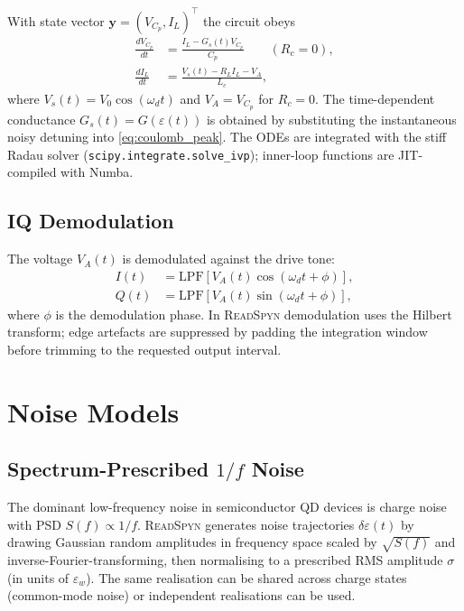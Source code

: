 \documentclass[11pt,a4paper]{article}
\begin{document}
With state vector $\mathbf{y}=(V_{C_p},I_L)^{\top}$ the circuit obeys
\begin{align}
  \frac{dV_{C_p}}{dt}
    &= \frac{I_L - G_s(t)V_{C_p}}{C_p}
       \qquad(R_c=0), \label{eq:ode1}\\[4pt]
  \frac{dI_L}{dt}
    &= \frac{V_s(t) - R_LI_L - V_A}{L_c}, \label{eq:ode2}
\end{align}
where $V_s(t)=V_0\cos(\omega_d t)$ and $V_A=V_{C_p}$ for $R_c=0$.
The time-dependent conductance $G_s(t)=G(\varepsilon(t))$ is obtained by
substituting the instantaneous noisy detuning into \eqref{eq:coulomb_peak}.
The ODEs are integrated with the stiff Radau solver
(\texttt{scipy.integrate.solve\_ivp}); inner-loop functions are JIT-compiled
with Numba.

\subsection{IQ Demodulation}

The voltage $V_A(t)$ is demodulated against the drive tone:
\begin{align}
  I(t) &= \mathrm{LPF}\!\left[V_A(t)\cos(\omega_d t+\phi)\right],\\
  Q(t) &= \mathrm{LPF}\!\left[V_A(t)\sin(\omega_d t+\phi)\right],
\end{align}
where $\phi$ is the demodulation phase.
In \textsc{ReadSpyn} demodulation uses the Hilbert transform; edge artefacts
are suppressed by padding the integration window before trimming to the
requested output interval.

\section{Noise Models}

\subsection{Spectrum-Prescribed $1/f$ Noise}

The dominant low-frequency noise in semiconductor QD devices is charge noise
with PSD $S(f)\propto 1/f$.
\textsc{ReadSpyn} generates noise trajectories $\delta\varepsilon(t)$ by
drawing Gaussian random amplitudes in frequency space scaled by $\sqrt{S(f)}$
and inverse-Fourier-transforming, then normalising to a prescribed RMS
amplitude $\sigma$ (in units of $\varepsilon_w$).
The same realisation can be shared across charge states (common-mode noise)
or independent realisations can be used.
\end{document}
